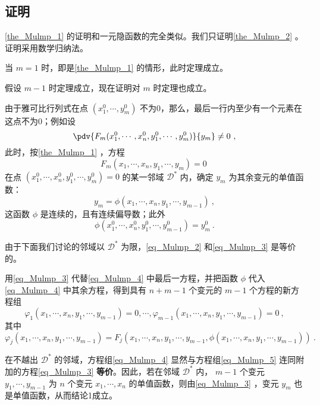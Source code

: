 \subsection{证明}
\autoref{the_Mulmp_1} 的证明和一元隐函数的完全类似。我们只证明\autoref{the_Mulmp_2} 。证明采用数学归纳法。

当 $m=1$ 时，即是\autoref{the_Mulmp_1} 的情形，此时定理成立。

假设 $m-1$ 时定理成立，现在证明对 $m$ 时定理也成立。

由于雅可比行列式在点 $(x_1^0,\cdots,y_m^0)$ 不为0，那么，最后一行内至少有一个元素在这点不为0；例如设
\begin{equation}
\pdv{F_m(x_1^0,\cdots,x_n^0,y_1^0,\cdots,y_m^0)}{y_m}\neq0~,
\end{equation}
此时，按\autoref{the_Mulmp_1} ，方程
\begin{equation}\label{eq_Mulmp_2}
F_m(x_1,\cdots,x_n,y_1,\cdots,y_m)=0~
\end{equation}
在点 $(x_1^0,\cdots,x_n^0,y_1^0,\cdots,y_m^0)=0$ 的某一邻域 $\mathcal{D}^*$ 内，确定 $y_m$ 为其余变元的单值函数：
\begin{equation}\label{eq_Mulmp_3}
y_m=\phi(x_1,\cdots,x_n,y_1,\cdots,y_{m-1})~,
\end{equation}
这函数 $\phi$ 是连续的，且有连续偏导数；此外
\begin{equation}
\phi(x_1^0,\cdots,x_n^0,y_1^0,\cdots,y_{m-1}^0)=y_m^0~.
\end{equation}

由于下面我们讨论的邻域以 $\mathcal{D}^*$ 为限，\autoref{eq_Mulmp_2} 和\autoref{eq_Mulmp_3} 是等价的。

用\autoref{eq_Mulmp_3} 代替\autoref{eq_Mulmp_4} 中最后一方程，并把函数 $\phi$ 代入\autoref{eq_Mulmp_4} 中其余方程，得到具有 $n+m-1$ 个变元的 $m-1$ 个方程的新方程组
\begin{equation}\label{eq_Mulmp_5}
\varphi_1(x_1,\cdots,x_n,y_1,\cdots,y_{m-1})=0,\cdots,\varphi_{m-1}(x_1,\cdots,x_n,y_1,\cdots,y_{m-1})=0~,
\end{equation}
其中
\begin{equation}\label{eq_Mulmp_6}\varphi_j(x_1,\cdots,x_n,y_1,\cdots,y_{m-1})=F_j(x_1,\cdots,x_n,y_1,\cdots,y_{m-1},\phi(x_1,\cdots,x_n,y_1,\cdots,y_{m-1}))~.
\end{equation}

在不越出 $\mathcal{D}^*$ 的邻域，方程组\autoref{eq_Mulmp_4} 显然与方程组\autoref{eq_Mulmp_5} 连同附加的方程\autoref{eq_Mulmp_3} \textbf{等价}。因此，若在邻域 $\mathcal{D}^*$ 内， $m-1$ 个变元 $y_1,\cdots,y_{m-1}$ 为 $n$ 个变元 $x_1,\cdots,x_n$ 的单值函数，则由\autoref{eq_Mulmp_3} ，变元 $y_m$ 也是单值函数，从而结论1成立。

